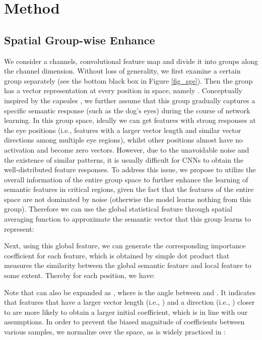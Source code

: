 \documentclass{article}
\begin{document}
	
	\section{Method}
	\subsection{Spatial Group-wise Enhance}
	We consider a  channels,  convolutional feature map and divide it into  groups along the channel dimension. Without loss of generality, we first examine a certain group separately (see the bottom black box in Figure \ref{fig_sge}). Then the group has a vector representation at every position in space, namely  . Conceptually inspired by the capsules \cite{sabour2017dynamic}, we further assume that this group gradually captures a specific semantic response (such as the dog's eyes) during the course of network learning. In this group space, ideally we can get features with strong responses at the eye positions (i.e., features with a larger vector length and similar vector directions among multiple eye regions), whilst other positions almost have no activation and become zero vectors. However, due to the unavoidable noise and the existence of similar patterns, it is usually difficult for CNNs to obtain the well-distributed feature responses. To address this issue, we propose to utilize the overall information of the entire group space to further enhance the learning of semantic features in critical regions, given the fact that the features of the entire space are not dominated by noise (otherwise the model learns nothing from this group). Therefore we can use the global statistical feature through spatial averaging function  to approximate the semantic vector that this group learns to represent:
	
	Next, using this global feature, we can generate the corresponding importance coefficient for each feature, which is obtained by simple dot product that measures the similarity between the global semantic feature  and local feature  to some extent. Thereby for each position, we have:
	
	Note that  can also be expanded as , where  is the angle between  and . It indicates that features that have a larger vector length (i.e., ) and a direction (i.e., ) closer to  are more likely to obtain a larger initial coefficient, which is in line with our assumptions.  In order to prevent the biased magnitude of coefficients between various samples, we normalize  over the space, as is widely practiced in \cite{ioffe2015batch,wu2018group,weightstandardization}:
	
\end{document}
